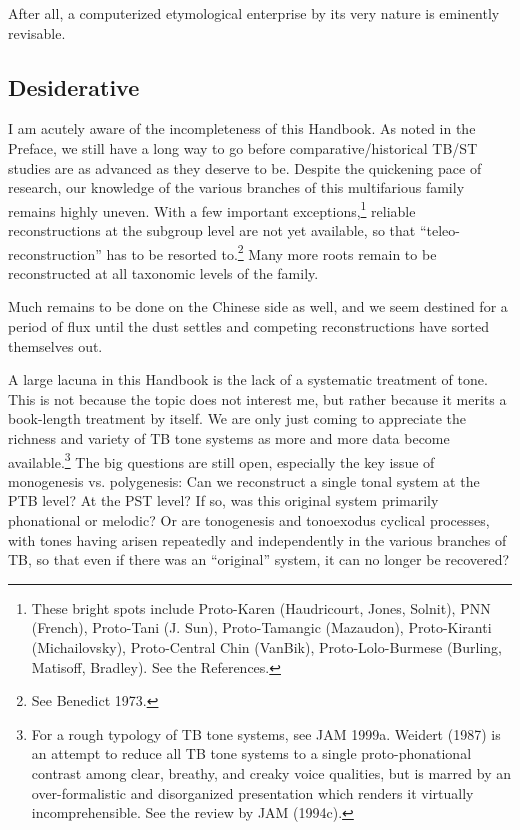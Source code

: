 After all, a computerized etymological enterprise by its very nature is eminently revisable.

\subsection{Desiderative}
I am acutely aware of the incompleteness of this Handbook. As noted in the Preface, we still have a long way to go before comparative/historical TB/ST studies are as advanced as they deserve to be. Despite the quickening pace of research, our knowledge of the various branches of this multifarious family remains highly uneven. With a few important exceptions,\footnote{These bright spots include Proto-Karen (Haudricourt, Jones, Solnit), PNN (French), Proto-Tani (J. Sun), Proto-Tamangic (Mazaudon), Proto-Kiranti (Michailovsky), Proto-Central Chin (VanBik), Proto-Lolo-Burmese (Burling, Matisoff, Bradley). See the References.} reliable reconstructions at the subgroup level are not yet available, so that ``teleo-reconstruction'' has to be resorted to.\footnote{See Benedict 1973.} Many more roots remain to be reconstructed at all taxonomic levels of the family.

Much remains to be done on the Chinese side as well, and we seem destined for a period of flux until the dust settles and competing reconstructions have sorted themselves out.

A large lacuna in this Handbook is the lack of a systematic treatment of tone. This is not because the topic does not interest me, but rather because it merits a book-length treatment by itself. We are only just coming to appreciate the richness and variety of TB tone systems as more and more data become available.\footnote{For a rough typology of TB tone systems, see JAM 1999a. Weidert (1987) is an attempt to reduce all TB tone systems to a single proto-phonational contrast among clear, breathy, and creaky voice qualities, but is marred by an over-formalistic and disorganized presentation which renders it virtually incomprehensible. See the review by JAM (1994c).} The big questions are still open, especially the key issue of monogenesis vs. polygenesis: Can we reconstruct a single tonal system at the PTB level? At the PST level? If so, was this original system primarily phonational or melodic? Or are tonogenesis and tonoexodus cyclical processes, with tones having arisen repeatedly and independently in the various branches of TB, so that even if there was an ``original'' system, it can no longer be recovered?

